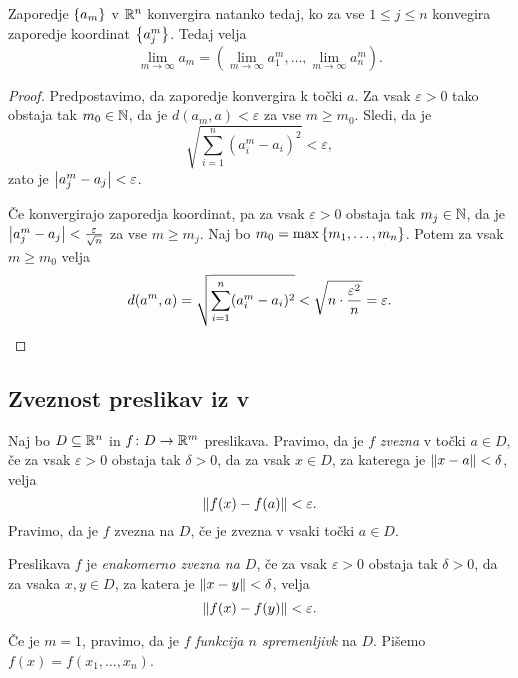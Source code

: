 \begin{trditev}
Zaporedje $\left\{a_m\right\}$ v $\mathbb{R}^n$ konvergira natanko tedaj, ko za vse
$1 \leq j \leq n$ konvegira zaporedje koordinat $\left\{a_j^m\right\}$.
Tedaj velja
\[
\lim_{m\to\infty} a_m = \left(\lim_{m\to\infty} a_1^m, \dots,
\lim_{m\to\infty} a_n^m\right).
\]
\end{trditev}

\begin{proof}
Predpostavimo, da zaporedje konvergira k točki $a$. Za vsak
$\varepsilon>0$ tako obstaja tak $m_0 \in \mathbb{N}$, da je
$d(a_m,a) < \varepsilon$ za vse $m \geq m_0$. Sledi, da je
\[
\sqrt{\sum_{i=1}^n \left(a_i^m - a_i\right)^2} < \varepsilon,
\]
zato je $\left\lvert a_j^m - a_j\right\rvert < \varepsilon$.

Če konvergirajo zaporedja koordinat, pa za vsak $\varepsilon>0$
obstaja tak $m_j \in \mathbb{N}$, da je
$\left\lvert a_j^m - a_j\right\rvert < \frac{\varepsilon}{\sqrt{n}}$ za vse
$m \geq m_j$. Naj bo $m_0 = \max\left\{m_1, \dots, m_n\right\}$. Potem za
vsak $m \geq m_0$ velja
\[
d(a^m,a) = \sqrt{\sum_{i=1}^n (a_i^m - a_i)^2}
< \sqrt{n \cdot \frac{\varepsilon^2}{n}} = \varepsilon. \qedhere
\]
\end{proof}

\newpage

\subsection{Zveznost preslikav iz  v }

\begin{definicija}
Naj bo $D \subseteq \mathbb{R}^n$ in $f \colon D\to\mathbb{R}^m$ preslikava.
Pravimo, da je $f$ \emph{zvezna} v točki
$a\in D$, če za vsak $\varepsilon > 0$ obstaja tak $\delta > 0$, da
za vsak $x \in D$, za katerega je $\left\lVert x - a\right\rVert < \delta$, velja
\[
\left\lVert f(x) - f(a)\right\rVert < \varepsilon.
\]
Pravimo, da je $f$ zvezna na $D$, če je zvezna v vsaki točki
$a \in D$.
\end{definicija}

\begin{definicija}
Preslikava $f$ je
\emph{enakomerno zvezna na $D$},
če za vsak $\varepsilon > 0$ obstaja tak $\delta > 0$, da za vsaka
$x,y \in D$, za katera je $\left\lVert x - y\right\rVert < \delta$, velja
\[
\left\lVert f(x) - f(y)\right\rVert < \varepsilon.
\]
\end{definicija}

\begin{opomba}
Če je $m = 1$, pravimo, da je $f$
\emph{funkcija $n$ spremenljivk}
na $D$. Pišemo $f(x) = f(x_1, \dots, x_n)$.
\end{opomba}

